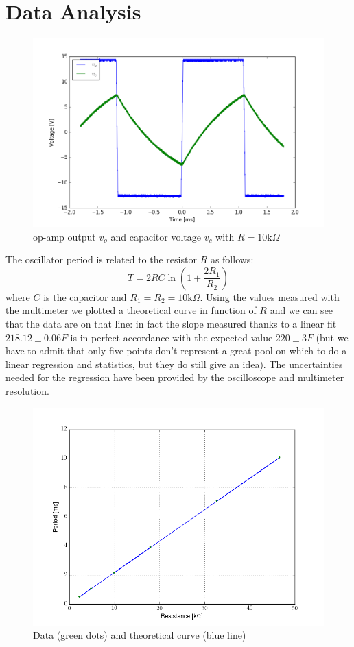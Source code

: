 \section{Data Analysis}
\begin{figure}[H]
\centering
\includegraphics[width=.7\textwidth]{5/10k_plot.png}
\caption{op-amp output $v_o$ and capacitor voltage $v_c$ with $R=10\text{k}\Omega$}
\end{figure}
The oscillator period is related to the resistor $R$ as follows:
\[T = 2RC\ln \left(1+\frac{2R_1}{R_2}\right)\]
where $C$ is the capacitor and $R_1=R_2=10\text{k}\Omega$. Using the values measured with the multimeter we plotted a theoretical curve in function of $R$ and we can see that the data are on that line: in fact the slope measured thanks to a linear fit $218.12 \pm 0.06 F$ is in perfect accordance with the expected value $220 \pm 3 F$ (but we have to admit that only five points don't represent a great pool on which to do a linear regression and statistics, but they do still give an idea). The uncertainties needed for the regression have been provided by the oscilloscope and multimeter resolution. 
\begin{figure}[H]
\centering
\includegraphics[width=.7\textwidth]{5/fit.png}
\caption{Data (green dots) and theoretical curve (blue line)}
\end{figure}
